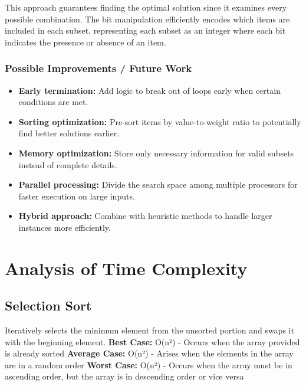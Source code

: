 \documentclass{article}
\begin{document}
This approach guarantees finding the optimal solution since it examines every possible combination. The bit manipulation efficiently encodes which items are included in each subset, representing each subset as an integer where each bit indicates the presence or absence of an item.
\subsubsection*{Possible Improvements / Future Work}
\begin{itemize}
    \item \textbf{Early termination:} Add logic to break out of loops early when certain conditions are met.
    \item \textbf{Sorting optimization:} Pre-sort items by value-to-weight ratio to potentially find better solutions earlier.
    \item \textbf{Memory optimization:} Store only necessary information for valid subsets instead of complete details.
    \item \textbf{Parallel processing:} Divide the search space among multiple processors for faster execution on large inputs.
    \item \textbf{Hybrid approach:} Combine with heuristic methods to handle larger instances more efficiently.
\end{itemize}







\clearpage
\section{Analysis of Time Complexity}
\subsection{Selection Sort}
Iteratively selects the minimum element from the unsorted portion and swaps it with the beginning element.\newline
\newline
\textbf{Best Case:} O(n²) - Occurs when the array provided is already sorted \newline
\textbf{Average Case:} O(n²) - Arises when the elements in the array are in a random order \newline
\textbf{Worst Case:} O(n²) - Occurs when the array must be in ascending order, but the array is in descending order or vice versa
\end{document}
